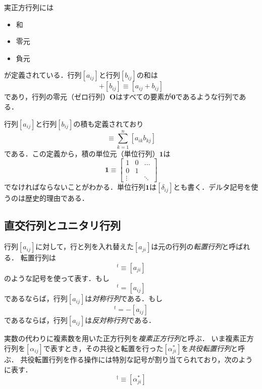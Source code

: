 \documentclass{jsbook}
\newcommand{\keyword}[1]{\emph{#1}}
\newcommand{\zero}{\mathbf{0}}
\newcommand{\Zero}{\mathbf{O}}
\newcommand{\One}{\mathbf{1}}
\begin{document}
実正方行列には
\begin{itemize}
\item 和
\item 零元
\item 負元
\end{itemize}
が定義されている．行列$[a_{ij}]$と行列$[b_{ij}]$の和は
\begin{equation}
[a_{ij}]+[b_{ij}]\equiv[a_{ij}+b_{ij}]
\end{equation}
であり，行列の零元（ゼロ行列）$\Zero$はすべての要素が$\zero$であるような行列である．

行列$[a_{ij}]$と行列$[b_{ij}]$の積も定義されており
\begin{equation}
[a_{ij}][b_{ij}]\equiv\sum_{k=1}^n[a_{ik}b_{kj}]
\end{equation}
である．この定義から，積の単位元（単位行列）$\One$は
\begin{equation}
\One\equiv\begin{bmatrix}1&0&\dots\\
  0&1\\
  \vdots&&\ddots\end{bmatrix}
\end{equation}
でなければならないことがわかる．単位行列$\One$は$[\delta_{ij}]$とも書く．デルタ記号を使うのは歴史的理由である．

\subsection{直交行列とユニタリ行列}

行列$[a_{ij}]$に対して，行と列を入れ替えた$[a_{ji}]$は元の行列の\keyword{転置行列}と呼ばれる．
転置行列は
\begin{equation}
[a_{ij}]^t\equiv[a_{ji}]
\end{equation}
のような記号を使って表す．もし
\begin{equation}
[a_{ij}]^t=[a_{ij}]
\end{equation}
であるならば，行列$[a_{ij}]$は\keyword{対称行列}である．もし
\begin{equation}
[a_{ij}]^t=-[a_{ij}]
\end{equation}
であるならば，行列$[a_{ij}]$は\keyword{反対称行列}である．

実数の代わりに複素数を用いた正方行列を\keyword{複素正方行列}と呼ぶ．
いま複素正方行列を$[\alpha_{ij}]$で表すとき，その共役と転置を行った$[\alpha^*_{ji}]$を\keyword{共役転置行列}と呼ぶ．
共役転置行列を作る操作には特別な記号が割り当てられており，次のように表す．
\begin{equation}
[\alpha_{ij}]^\dagger\equiv[\alpha^*_{ji}]
\end{equation}
\end{document}
